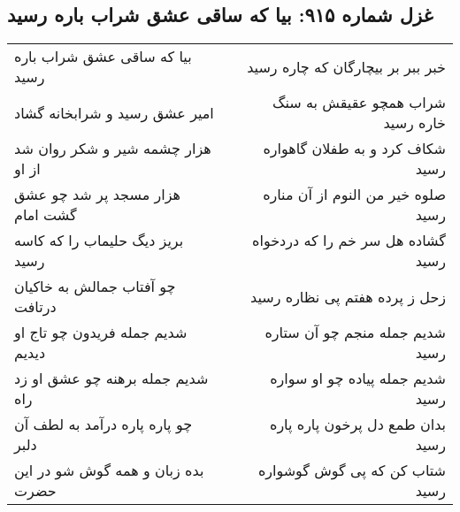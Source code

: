 \begin{center}
\section*{غزل شماره ۹۱۵: بیا که ساقی عشق شراب باره رسید}
\label{sec:0915}
\begin{longtable}{l p{0.5cm} r}
بیا که ساقی عشق شراب باره رسید
&&
خبر ببر بر بیچارگان که چاره رسید
\\
امیر عشق رسید و شرابخانه گشاد
&&
شراب همچو عقیقش به سنگ خاره رسید
\\
هزار چشمه شیر و شکر روان شد از او
&&
شکاف کرد و به طفلان گاهواره رسید
\\
هزار مسجد پر شد چو عشق گشت امام
&&
صلوه خیر من النوم از آن مناره رسید
\\
بریز دیگ حلیماب را که کاسه رسید
&&
گشاده هل سر خم را که دردخواه رسید
\\
چو آفتاب جمالش به خاکیان درتافت
&&
زحل ز پرده هفتم پی نظاره رسید
\\
شدیم جمله فریدون چو تاج او دیدیم
&&
شدیم جمله منجم چو آن ستاره رسید
\\
شدیم جمله برهنه چو عشق او زد راه
&&
شدیم جمله پیاده چو او سواره رسید
\\
چو پاره پاره درآمد به لطف آن دلبر
&&
بدان طمع دل پرخون پاره پاره رسید
\\
بده زبان و همه گوش شو در این حضرت
&&
شتاب کن که پی گوش گوشواره رسید
\\
\end{longtable}
\end{center}
